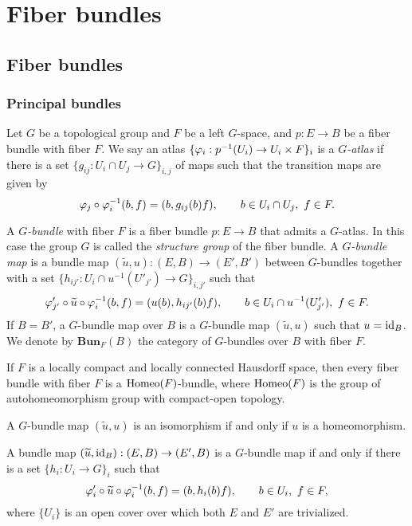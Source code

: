\documentclass{../../large}
\begin{document}
\part{Fiber bundles}

\chapter{Fiber bundles}


\section{Principal bundles}

\begin{prb}
Let $G$ be a topological group and $F$ be a left $G$-space, and $p:E\to B$ be a fiber bundle with fiber $F$.
We say an atlas $\{\varphi_i:p^{-1}(U_i)\to U_i\times F\}_i$ is a \emph{$G$-atlas} if there is a set $\{g_{ij}:U_i\cap U_j\to G\}_{i,j}$ of maps such that the transition maps are given by
\[\varphi_j\circ\varphi_i^{-1}(b,f)=(b,g_{ij}(b)f),
\qquad b\in U_i\cap U_j,\ f\in F.\]

A \emph{$G$-bundle} with fiber $F$ is a fiber bundle $p:E\to B$ that admits a $G$-atlas.
In this case the group $G$ is called the \emph{structure group} of the fiber bundle.
A \emph{$G$-bundle map} is a bundle map $(\tilde u,u):(E,B)\to(E',B')$ between $G$-bundles together with a set $\{h_{ij'}:U_i\cap u^{-1}(U'_{j'})\to G\}_{i,j'}$ such that
\[\varphi'_{j'}\circ\widetilde u\circ \varphi_i^{-1}(b,f)=(u(b),h_{ij'}(b)f),
\qquad b\in U_i\cap u^{-1}(U'_{j'}),\ f\in F.\]
If $B=B'$, a $G$-bundle map over $B$ is a $G$-bundle map $(\tilde u,u)$ such that $u=\operatorname{id}_B$.
We denote by $\mathbf{Bun}_F(B)$ the category of $G$-bundles over $B$ with fiber $F$.
\begin{parts}
\item If $F$ is a locally compact and locally connected Hausdorff space, then every fiber bundle with fiber $F$ is a $\operatorname{Homeo}(F)$-bundle, where $\operatorname{Homeo}(F)$ is the group of autohomeomorphism group with compact-open topology.
\item A $G$-bundle map $(\tilde u,u)$ is an isomorphism if and only if $u$ is a homeomorphism.
\item A bundle map $(\widetilde u,\operatorname{id}_B):(E,B)\to(E',B)$ is a $G$-bundle map if and only if there is a set $\{h_i:U_i\to G\}_i$ such that
\[\varphi_i'\circ\widetilde u\circ\varphi_i^{-1}(b,f)=(b,h_i(b)f),
\qquad b\in U_i,\ f\in F,\]
where $\{U_i\}$ is an open cover over which both $E$ and $E'$ are trivialized.
\end{parts}
\end{prb}
\end{document}

